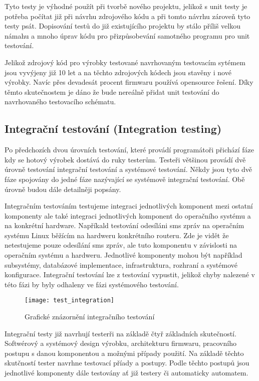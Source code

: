 Tyto testy je výhodné použít při tvorbě nového projektu, jelikož s unit testy je potřeba počítat již při návrhu zdrojového kódu a při tomto návrhu zároveň tyto testy psát. Dopisování testů do již existujícího projektu by stálo příliš velkou námahu a mnoho úprav kódu pro přizpůsobevání samotného programu pro unit testování.

Jelikož zdrojový kód pro výrobky testované navrhovaným testovacím sytémem jsou vyvýjeny již 10 let a na těchto zdrojových kódech jsou stavěny i nové výrobky. Navíc přes devadesát procent firmwaru používá opensource řešení. Díky těmto skutečnostem je dáno že bude nereálně přidat unit testování do navrhovaného testovacího schématu.

\subsection{Integrační testování (Integration testing)}
Po předchozích dvou úrovních testování, které provádí programátoři přichází fáze kdy se hotový výrobek dostává do ruky testerům. Testeři většinou provádí dvě úrovně testování integrační testování a systémové testování. Někdy jsou tyto dvě fáze spojovány do jedné fáze nazývající se systémově integrační testování. Obě úrovně budou dále detailněji popsány.

Integračním testováním testujeme integraci jednotlivých komponent mezi ostatní komponenty ale také integraci jednotlivých komponent do operačního systému a na konkrétní hardware. Napříkald testování odesíláni sms zpráv na operačním systému Linux běžícím na hardweru konkrétního routeru. Zde je vidět že netestujeme pouze odesílání sms zpráv, ale tuto komponentu v závislosti na operačním systému a hardweru. Jednotlivé komponenty mohou být například subsystémy, databázové implementace, infrastruktura, rozhraní a systémové konfigurace. Integrační testování lze z testování vypustit, jelikož chyby nalezené v této fázi by byly odhaleny ve fázi systémového testování.

\begin{figure}[h]
  \centering
  \texttt{[image: test\_integration]}
  \caption{Grafické znázornění integračního testování}
  \label{fig:test_integration}
\end{figure}

Integrační testy již navrhují testerři na základě čtyř základních skutečností. Softwérový a systémový design výrobku, architekturu firmwaru, pracovního postupu s danou komponentou a možnými případy použití. Na základě těchto skutčností tester navrhne testovací příady a postupy. Podle těchto postupů jsou jednotlivé komponenty dále testovány ať již testery či automaticky automatem.

